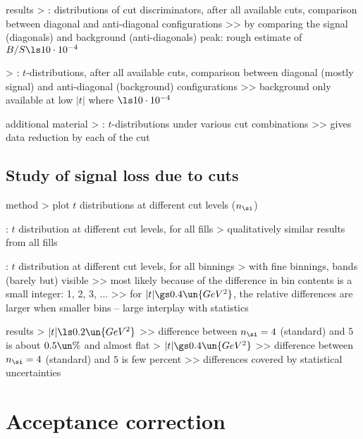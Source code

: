 \> results
\>> : distributions of cut discriminators, after all available cuts, comparison between diagonal and anti-diagonal configurations
\>>> by comparing the signal (diagonals) and background (anti-diagonals) peak: rough estimate of $B/S \ls 10\cdot10^{-4}$

\>> : $t$-distributions, after all available cuts, comparison between diagonal (mostly signal) and anti-diagonal (background) configurations
\>>> background only available at low $|t|$ where $\ls 10\cdot10^{-4}$

\> additional material
\>> : $t$-distributions under various cut combinations
\>>> gives data reduction by each of the cut

\subsection{Study of signal loss due to cuts}

\> method
\>> plot $t$ distributions at different cut levels ($n_\si$)

\> : $t$ distribution at different cut levels, for all fills
\>> qualitatively similar results from all fills

\> : $t$ distribution at different cut levels, for all binnings
\>> with fine binnings, bands (barely but) visible
\>>> most likely because of the difference in bin contents is a small integer: 1, 2, 3, ...
\>>> for $|t| \gs 0.4\un{GeV^2}$, the relative differences are larger when smaller bins -- large interplay with statistics

\> results
\>> $|t| \ls 0.2\un{GeV^2}$
\>>> difference between $n_\si = 4$ (standard) and $5$ is about $0.5\un{\%}$ and almost flat
\>> $|t| \gs 0.4\un{GeV^2}$
\>>> difference between $n_\si = 4$ (standard) and $5$ is few percent
\>>> differences covered by statistical uncertainties


\section{Acceptance correction}


